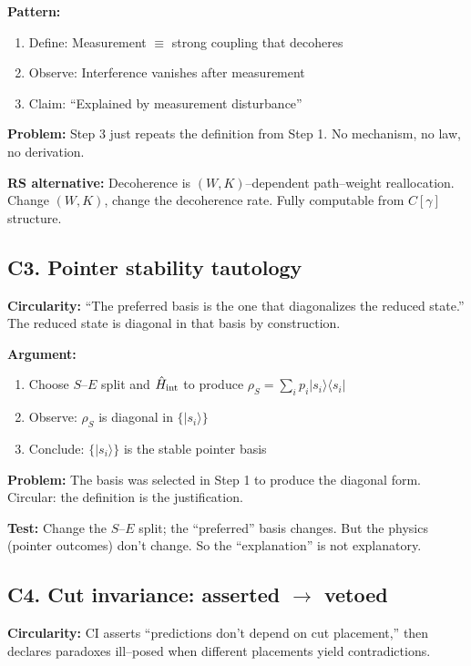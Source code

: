 \documentclass[11pt]{article}
\begin{document}
\textbf{Pattern:}
\begin{enumerate}[nosep]
  \item Define: Measurement $\equiv$ strong coupling that decoheres
  \item Observe: Interference vanishes after measurement
  \item Claim: ``Explained by measurement disturbance''
\end{enumerate}

\textbf{Problem:} Step 3 just repeats the definition from Step 1. No mechanism, no law, no derivation.

\textbf{RS alternative:} Decoherence is $(W,K)$--dependent path--weight reallocation. Change $(W,K)$, change the decoherence rate. Fully computable from $C[\gamma]$ structure.

\subsection{C3. Pointer stability tautology}

\begin{warnbox}
\textbf{Circularity:} ``The preferred basis is the one that diagonalizes the reduced state.'' The reduced state is diagonal in that basis by construction.
\end{warnbox}

\textbf{Argument:}
\begin{enumerate}[nosep]
  \item Choose $S$--$E$ split and $\hat H_{\rm int}$ to produce $\rho_S=\sum_i p_i|s_i\rangle\langle s_i|$
  \item Observe: $\rho_S$ is diagonal in $\{|s_i\rangle\}$
  \item Conclude: $\{|s_i\rangle\}$ is the stable pointer basis
\end{enumerate}

\textbf{Problem:} The basis was selected in Step 1 to produce the diagonal form. Circular: the definition is the justification.

\textbf{Test:} Change the $S$--$E$ split; the ``preferred'' basis changes. But the physics (pointer outcomes) don't change. So the ``explanation'' is not explanatory.

\subsection{C4. Cut invariance: asserted $\to$ vetoed}

\begin{warnbox}
\textbf{Circularity:} CI asserts ``predictions don't depend on cut placement,'' then declares paradoxes ill--posed when different placements yield contradictions.
\end{warnbox}
\end{document}
